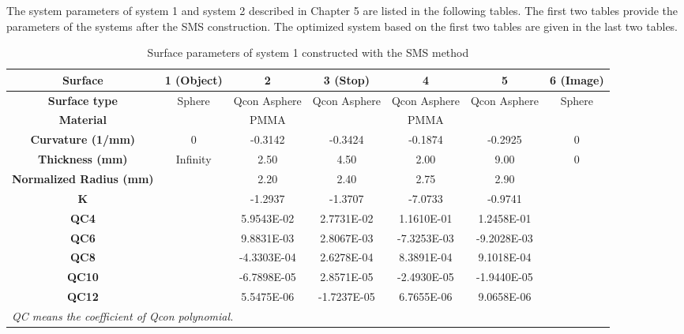 The system parameters of system 1 and system 2 described in Chapter 5 are listed in the following tables. The first two tables provide the parameters of the systems after the SMS construction. The optimized system based on the first two tables are given in the last two tables. 

\setlength{\arrayrulewidth}{.5mm}
\setlength{\tabcolsep}{18pt}
\renewcommand{\arraystretch}{1.2}
\begin{table}[h!]
    \centering
    \captionsetup{justification=centering}
    \caption{Surface parameters of system 1 constructed with the SMS method}
    \label{table: chap5 - sys1 - SMS}
    \vspace{-1em}
    \begin{adjustbox}{max width=\textwidth, center}
    \begin{tabular}{c c c c c c c}
    \hline 
     \textbf{Surface} & \textbf{1 (Object)} & \textbf{2} & \textbf{3 (Stop)} & \textbf{4} & \textbf{5} & \textbf{6 (Image)}\\ 
     \midrule
    \rowcolor[gray]{0.9}  \textbf{Surface type} & Sphere & Qcon Asphere & Qcon Asphere & Qcon Asphere & Qcon Asphere & Sphere \\ 
    \textbf{Material} &  & PMMA &  & PMMA & & \\
   \rowcolor[gray]{0.9}  \textbf{Curvature (1/mm)} & 0 & -0.3142 & -0.3424 & -0.1874 &-0.2925 & 0\\
    \textbf{Thickness (mm)} & Infinity & 2.50 & 4.50 & 2.00 & 9.00 & 0 \\ 
    \rowcolor[gray]{0.9} \textbf{Normalized Radius (mm)} & & 2.20 & 2.40 & 2.75 & 2.90 & \\
    \textbf{K} & & -1.2937 & -1.3707 & -7.0733 & -0.9741&\\
    \rowcolor[gray]{0.9} \textbf{QC4} & & 5.9543E-02 & 2.7731E-02 & 1.1610E-01 &  1.2458E-01 &  \\ 
    \textbf{QC6} & &  9.8831E-03 & 2.8067E-03 & -7.3253E-03 & -9.2028E-03 &\\
   \rowcolor[gray]{0.9}  \textbf{QC8} & & -4.3303E-04 &  2.6278E-04 &  8.3891E-04 &  9.1018E-04 & \\
    \textbf{QC10} & & -6.7898E-05 &  2.8571E-05 & -2.4930E-05 & -1.9440E-05 & \\ 
   \rowcolor[gray]{0.9}  \textbf{QC12} & &  5.5475E-06 & -1.7237E-05 &  6.7655E-06 &  9.0658E-06 &\\
    \hline
    \multicolumn{6}{l}{\textit{\footnotesize{QC means the coefficient of Qcon polynomial.}}}\\
    \end{tabular}
    \end{adjustbox}
\end{table}

